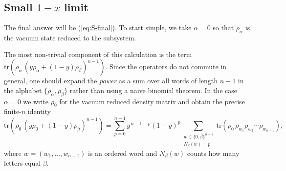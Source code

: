 \documentclass[11pt]{article}
\newcommand{\tr}{\mathrm{tr}}
\newcommand{\mO}{\mathcal{O}}
\newcommand{\nn}{\nonumber}
\begin{document}
  \subsection*{Small $1-x$ limit}

  The final answer will be (\ref{eq:S-final}). To start simple, we take $\alpha=0$
  so that $\rho_{\alpha}$ is the vacuum state reduced to the subsystem.


  The most non-trivial component of this calculation is the term
  $\text{tr}\!\left (\rho_{\alpha}\,(y\rho_{\alpha}+(1-y)\rho_{\beta})^{n-1}\right
  )$. Since the operators do not commute in general, one should expand the \emph{power}
  as a sum over all words of length $n-1$ in the alphabet $\{\rho_{\alpha},\rho_{\beta}
  \}$ rather than using a naive binomial theorem. In the case $\alpha=0$ we
  write $\rho_{0}$ for the vacuum reduced density matrix and obtain the precise
  finite-$n$ identity
  \begin{equation}
    \label{eq:word-expansion-alpha0}\tr\!\left(\rho_{0}\,(y\rho_{0}+(1-y)\rho_{\beta}
    )^{n-1}\right) = \sum_{p=0}^{n-1}y^{\,n-1-p}(1-y)^{p}\sum_{\substack{w\in\{0,\beta\}^{n-1}\\ N_\beta(w)=p}}
    \tr\!\left(\rho_{0}\,\rho_{w_1}\rho_{w_2}\cdots \rho_{w_{n-1}}\right),
  \end{equation}
  where $w=(w_{1},\dots,w_{n-1})$ is an ordered word and $N_{\beta}(w)$ counts
  how many letters equal $\beta$.
\end{document}
